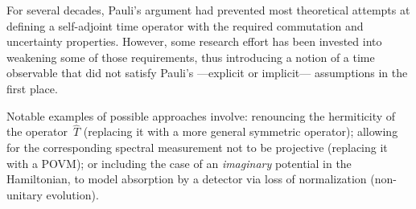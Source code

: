 
For several decades, Pauli's argument had prevented most theoretical attempts at
defining a self-adjoint time operator with the required commutation and uncertainty properties.
However, some research effort has been invested
into weakening some of those requirements, thus
introducing a notion of a time observable that did not satisfy
Pauli's ---explicit or implicit--- assumptions in the first place.

Notable examples of possible approaches involve:
renouncing the hermiticity of the operator~$\hat{T}$ (replacing it with a more general symmetric operator);
allowing for the corresponding spectral measurement not to be projective (replacing it with a POVM);
or including the case of an \emph{imaginary} potential in the Hamiltonian,
to model absorption by a detector via loss of normalization (non-unitary evolution).
